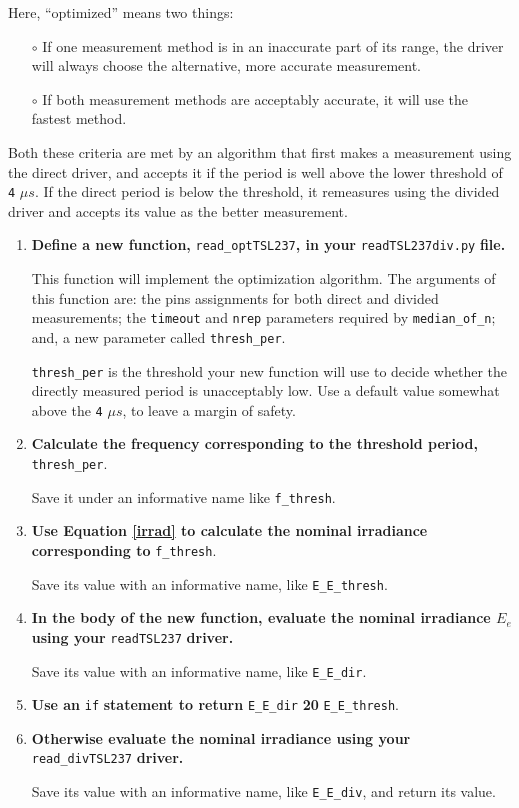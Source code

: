 Here, ``optimized'' means two things:
\begin{itemize}
	\item[$\circ$] If one measurement method is in an inaccurate part of its range, the driver will always choose the alternative, more accurate measurement.
	\item[$\circ$] If both measurement methods are acceptably accurate, it will use the fastest method.
\end{itemize} 
Both these criteria are met by an algorithm that first makes a measurement using the direct driver, and accepts it if the period is well above the lower threshold of \texttt{4} $\mu s$.
If the direct period is below the threshold, it remeasures using the divided driver and accepts its value as the better measurement.
\begin{enumerate}
	\item \textbf{Define a new function,} \lstinline{read_optTSL237}\textbf{, in your} \lstinline{readTSL237div.py} \textbf{file.}
	
	This function will implement the optimization algorithm.
	The arguments of this function are: the pins assignments for both direct and divided measurements; the \lstinline{timeout} and \lstinline{nrep} parameters required by \lstinline{median_of_n}; and, a new parameter called \lstinline{thresh_per}.
	
	\smallskip
	\lstinline{thresh_per} is the threshold your new function will use to decide whether the directly measured period is unacceptably low.
	Use a default value somewhat above the  \texttt{4} $\mu s$, to leave a margin of safety.
	
	\item \textbf{Calculate the frequency corresponding to the threshold period,} \lstinline{thresh_per}.
	
	Save it under an informative name like \lstinline{f_thresh}.

	\item \textbf{Use Equation \ref{irrad} to calculate the nominal irradiance corresponding to} \lstinline{f_thresh}.
	
	Save its value with an informative name, like \lstinline{E_E_thresh}.

	\item \textbf{In the body of the new function, evaluate the nominal irradiance $E_e$ using your} \lstinline{readTSL237} \textbf{driver.}
	
	Save its value with an informative name, like \lstinline{E_E_dir}.
	
	\item \textbf{Use an} \lstinline{if} \textbf{statement to return} \lstinline{E_E_dir} \textbf{20} \lstinline{E_E_thresh}.
	
	\item \textbf{Otherwise evaluate the nominal irradiance using your} \lstinline{read_divTSL237} \textbf{driver.}

	Save its value with an informative name, like \lstinline{E_E_div}, and return its value.	
\end{enumerate}


